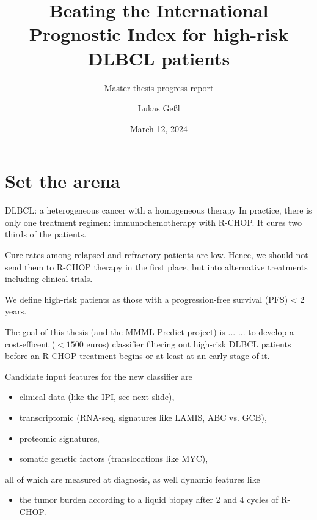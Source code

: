 \documentclass[10pt, aspectratio=169]{beamer}
\title{Beating the International Prognostic Index for high-risk DLBCL patients}
\subtitle{Master thesis progress report}
\date{March 12, 2024}
\author{Lukas Geßl}
\institute{Chair of Statistical Bioinformatics, Regensburg University}
\begin{document}
\maketitle

\section{Set the arena}

\begin{frame}{DLBCL: a heterogeneous cancer with a homogeneous therapy}
  In practice, there is only one treatment regimen: immunochemotherapy with R-CHOP. 
  It cures two thirds of the patients.

  Cure rates among relapsed and refractory patients are low. Hence, we should not send 
  them to R-CHOP therapy in the first place, but into alternative treatments including 
  clinical trials.
  
  \pause
  We define \alert{high-risk} patients as those with a 
  \alert{progression-free survival (PFS) < 2 years}.

  \medskip
  \begin{block}{The goal of this thesis (and the MMML-Predict project) is ...}
    ... to develop a \alert{cost-efficent ($< \num{1500}$ euros) classifier filtering out 
    high-risk DLBCL patients} before an R-CHOP treatment begins or at least at an early 
    stage of it.
  \end{block}
\end{frame}

\begin{frame}{}
  Candidate input features for the new classifier are 
  \begin{itemize}
    \item clinical data (like the IPI, see next slide),
    \item transcriptomic (RNA-seq, signatures like LAMIS, ABC vs. GCB),
    \item proteomic signatures,
    \item somatic genetic factors (translocations like MYC),
  \end{itemize}
  all of which are measured \alert{at diagnosis}, as well \alert{dynamic} features like 
  \begin{itemize}
    \item the tumor burden according to a liquid biopsy after 2 and 4 cycles of R-CHOP. 
  \end{itemize}

\end{frame}
\end{document}
